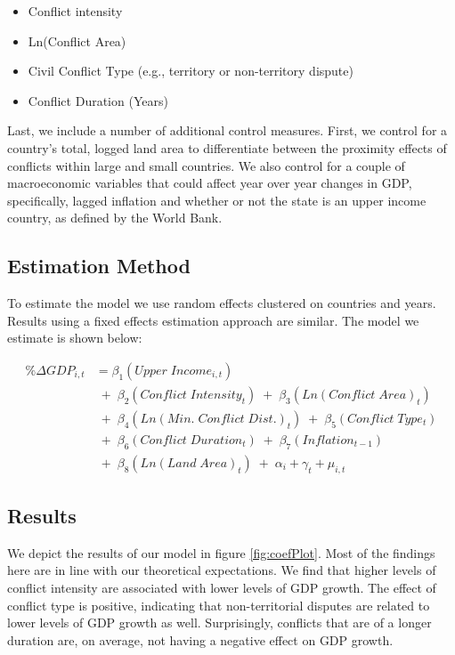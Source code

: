 \begin{itemize}
	\item Conflict intensity
	\item Ln(Conflict Area)
	\item Civil Conflict Type (e.g., territory or non-territory dispute)
	\item Conflict Duration (Years)
\end{itemize}

Last, we include a number of additional control measures. First, we control for a country's total, logged land area to differentiate between the proximity effects of conflicts within large and small countries. We also control for a couple of macroeconomic variables that could affect year over year changes in GDP, specifically, lagged inflation and whether or not the state is an upper income country, as defined by the World Bank.

\subsection{Estimation Method}

To estimate the model we use random effects clustered on countries and years. Results using a fixed effects estimation approach are similar. The model we estimate is shown below:

\begin{align*}
	\% \Delta GDP_{i,t} &= \beta_{1}(Upper \; Income_{i,t}) \\
	& \;+\; \beta_{2}(Conflict \; Intensity_{t}) \;+\; \beta_{3}(Ln(Conflict \; Area)_{t}) \\
	& \;+\; \beta_{4}(Ln(Min. \; Conflict \; Dist.)_{t}) \;+\; \beta_{5}(Conflict \; Type_{t}) \\
	& \;+\; \beta_{6}(Conflict \; Duration_{t}) \;+\; \beta_{7}(Inflation_{t-1}) \\
	& \;+\; \beta_{8}(Ln(Land \; Area)_{t}) \;+\; \alpha_{i} + \gamma_{t} + \mu_{i,t}
\end{align*}

\subsection{Results} 

We depict the results of our model in figure \ref{fig:coefPlot}. Most of the findings here are in line with our theoretical expectations. We find that higher levels of conflict intensity are associated with lower levels of GDP growth. The effect of conflict type is positive, indicating that non-territorial disputes are related to lower levels of GDP growth as well. Surprisingly, conflicts that are of a longer duration are, on average, not having a negative effect on GDP growth. 

